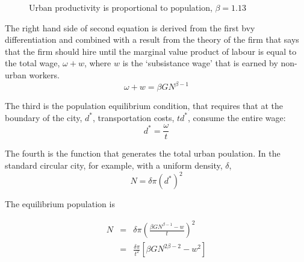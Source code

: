 \begin{figure}[]
    \begin{center}
    \vspace{.5cm}
    \caption{Urban productivity is proportional to population, $\beta=1.13$}
    \label{fig-scale-output}
    \end{center}
\end{figure}

The right hand side of second equation is derived from the first bvy differentiation and combined with a result from the theory of the firm that says that the firm should hire until the marginal value product of labour is equal to the total wage, $\omega+w$, where $w$ is the `subsistance wage' that is earned by non-urban workers.  
\[\omega+w = \beta GN^{\beta-1}\]

The third is the population equilibrium condition, that requires that at the boundary of the city, $d^*$,  transportation costs, $td^*$, consume the entire wage:
 \[d^*=\frac{\omega}{t}\]

 The fourth is the function that generates the total urban poulation. In the standard circular city, for example, with a uniform density, $\delta$,  
 \[N=\delta\pi (d^*)^2\]
 
 The equilibrium population  is 

\begin{eqnarray}
    N&=&\delta\pi (\frac{\beta GN^{\beta-1}-w}{t})^2\\
    &=&\frac{\delta\pi }{t^2} \left[\beta GN^{2\beta-2} -w^2\right]
\end{eqnarray}

